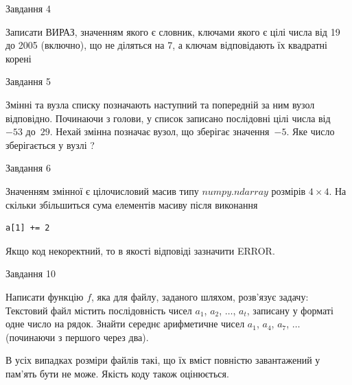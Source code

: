 \documentclass[12pt, ukrainian]{article}
\begin{document}
{\begin{minipage}[t]{8.0cm}
\end{minipage}


               
{\begin{center}Завдання {4}\end{center}}
\vspace{-4mm}
Записати ВИРАЗ, значенням якого є словник, ключами якого є цілі числа від 19 до 2005 (включно), що не діляться на 7, а ключам відповідають їх квадратні корені\par

\vspace{10mm}
               
{\begin{center}Завдання {5}\end{center}}
\vspace{-4mm}
Змінні  та  вузла списку позначають наступний та попередній за ним вузол відповідно. Починаючи з голови, у список записано послідовні цілі числа від~$-53$ до~$29$. Нехай змінна  позначає вузол, що зберігає значення~$-5$.
Яке число зберігається у вузлі  ?\par

               
{\begin{center}Завдання {6}\end{center}}
\vspace{-4mm}
Значенням змінної  є цілочисловий масив типу $numpy.ndarray$ розмірів $4{\times}4$. На скільки збільшиться сума елементів масиву  після виконання
\begin{verbatim}
a[1] += 2
\end{verbatim}


Якщо код некоректний, то в якості відповіді зазначити ERROR.\par

               
{\begin{center}Завдання {10}\end{center}}
\vspace{-4mm}

Написати функцію $f$, яка для файлу, заданого шляхом, розв’язує задачу:\\ Текстовий файл містить послідовність чисел $a_1$, $a_2$, $\ldots$, $a_t$, записану у форматі одне число на рядок. Знайти середнє арифметичне чисел $a_1$, $a_4$, $a_7$, $\ldots$ (починаючи з першого через два).

В усіх випадках розміри файлів такі, що їх вміст повністю завантажений у пам'ять бути не може. Якість коду також оцінюється.



}
\end{document}
